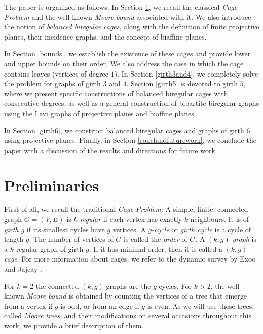 \documentclass[a4paper,11pt]{article}
\begin{document}
{The paper is organized as follows. In Section \ref{preliminaries}, we recall the classical {\emph{Cage Problem}} and the well-known {\emph{Moore bound}} associated with it. We also introduce the notion of {\emph{balanced biregular cages}}, along with the definition of finite projective planes, their incidence graphs, and the concept of biaffine planes. 

In Section \ref{bounds}, we establish the existence of these cages and provide lower and upper bounds 
on their order. We also address the case in which the cage contains leaves (vertices of degree $1$). In Section \ref{girth3and4}, we completely solve the problem for graphs of girth $3$ and $4$. Section \ref{girth5} is devoted to girth $5$, where we present specific constructions of balanced biregular cages with consecutive degrees, as well as a general construction of bipartite biregular graphs using the Levi graphs of projective planes and biaffine planes.

In Section \ref{girth6}, we construct balanced biregular cages and graphs of girth $6$ using projective planes. Finally, in Section \ref{conclandfuturework}, we conclude the paper with a discussion of the results and directions for future work. 

\section{Preliminaries} \label{preliminaries}
First of all, we recall the traditional  {\emph{Cage Problem:}} A simple, finite, connected graph $G=(V, E)$ is \emph{$k$-regular} if each vertex has exactly 
$k$ neighbours. It is of  \emph{girth $g$} if its smallest cycles have $g$ vertices. A 
\emph{$g$-cycle} or  \emph{girth cycle} is a cycle of length $g$. The number 
of vertices of $G$ is called the \emph{order} of $G$. A \emph{$(k,g)$-graph} is a
$k$-regular graph of girth $g$. If it has minimal order, then it is called a 
\emph{$(k,g)$-cage}. For more information about cages, we refer to the dynamic 
survey by Exoo and Jajcay \cite{ExooJaj08}.

For $k=2$ the connected $(k,g)$-graphs are the $g$-cycles. For $k>2$, the well-known \emph{Moore bound} is obtained by counting the vertices of a tree that emerge from a vertex if $g$ is odd, or from an edge if $g$ is even. As we will use these trees, called  {\em{Moore trees}}, and their
modifications on several occasions throughout this work, we provide a brief description of them.

}
\end{document}
